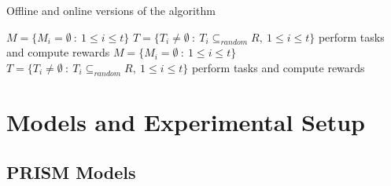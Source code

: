 \documentclass{llncs}
\begin{document}
\begin{algorithm}[H]
\caption{Offline and online versions of the algorithm}
\label{alg:main_process}
\begin{scriptsize}
\begin{algorithmic}
 
  \State $M = \{M_i = \emptyset\ :\ 1\leq i \leq t\}$ 
  \State $T = \{T_i\neq \emptyset\ :\ T_i \subseteq_{random} R,\ 1\leq i \leq t\}$ 
    \State {}
  \EndFor
  \State perform tasks and compute rewards
\EndProcedure
\Statex
{} 
  \State $M = \{M_i = \emptyset\ :\ 1\leq i \leq t\}$ 
    \State {}
  \EndFor
  \State $T = \{T_i\neq \emptyset\ :\ T_i \subseteq_{random} R,\ 1\leq i \leq t\}$ 
  \State perform tasks and compute rewards
\EndProcedure
\end{algorithmic}
\end{scriptsize}
\end{algorithm}
 

\section{Models and Experimental Setup}

\subsection{PRISM Models}\label{sect:prismmodels}
\end{document}
